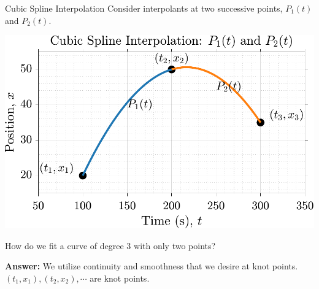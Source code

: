 \documentclass[aspectratio=169,xcolor=dvipsnames,svgnames,x11names,fleqn]{beamer}
\begin{document}
\begin{frame}{Cubic Spline Interpolation}
Consider interpolants at two successive points, $P_1(t)$ and $P_2(t)$.
\begin{center}
\includegraphics[width=0.4\linewidth]{../Code/figures/Ch02_CubicSpline_Segments.pdf}
\end{center}

\vspace{10pt}

How do we fit a curve of degree 3 with only two points?

\textbf{Answer:} We utilize continuity and smoothness that we desire at knot points. $(t_1, x_1), (t_2, x_2), \cdots $ are knot points.

\end{frame}
\end{document}
